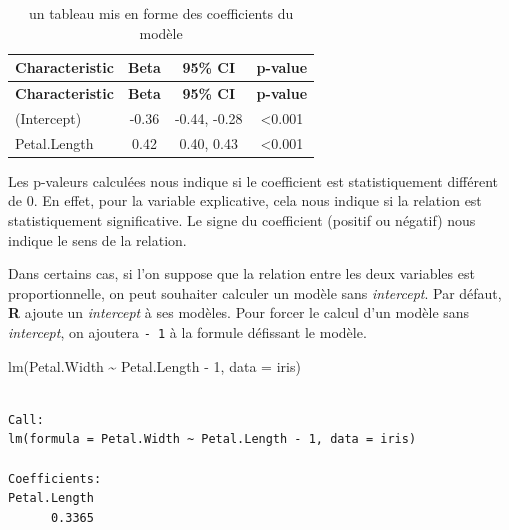\documentclass[
  letterpaper,
  DIV=11,
  numbers=noendperiod,
  oneside]{scrreprt}
\newenvironment{Shaded}{\begin{snugshade}}{\end{snugshade}}
\newcommand{\AttributeTok}[1]{\textcolor[rgb]{0.40,0.45,0.13}{#1}}
\newcommand{\DecValTok}[1]{\textcolor[rgb]{0.68,0.00,0.00}{#1}}
\newcommand{\FunctionTok}[1]{\textcolor[rgb]{0.28,0.35,0.67}{#1}}
\newcommand{\NormalTok}[1]{\textcolor[rgb]{0.00,0.23,0.31}{#1}}
\newcommand{\SpecialCharTok}[1]{\textcolor[rgb]{0.37,0.37,0.37}{#1}}
\begin{document}
\hypertarget{tbl-regression-lm}{}
\begin{longtable}[]{@{}lccc@{}}
\caption{\label{tbl-regression-lm}un tableau mis en forme des
coefficients du modèle}\tabularnewline
\toprule()
\textbf{Characteristic} & \textbf{Beta} & \textbf{95\% CI} &
\textbf{p-value} \\
\midrule()
\endfirsthead
\toprule()
\textbf{Characteristic} & \textbf{Beta} & \textbf{95\% CI} &
\textbf{p-value} \\
\midrule()
\endhead
(Intercept) & -0.36 & -0.44, -0.28 & \textless0.001 \\
Petal.Length & 0.42 & 0.40, 0.43 & \textless0.001 \\
\bottomrule()
\end{longtable}

Les p-valeurs calculées nous indique si le coefficient est
statistiquement différent de 0. En effet, pour la variable explicative,
cela nous indique si la relation est statistiquement significative. Le
signe du coefficient (positif ou négatif) nous indique le sens de la
relation.

\begin{tcolorbox}[enhanced jigsaw, colbacktitle=quarto-callout-tip-color!10!white, opacityback=0, toprule=.15mm, colback=white, coltitle=black, bottomtitle=1mm, toptitle=1mm, titlerule=0mm, rightrule=.15mm, title=\textcolor{quarto-callout-tip-color}{\faLightbulb}\hspace{0.5em}{Astuce}, breakable, bottomrule=.15mm, opacitybacktitle=0.6, arc=.35mm, left=2mm, leftrule=.75mm, colframe=quarto-callout-tip-color-frame]

Dans certains cas, si l'on suppose que la relation entre les deux
variables est proportionnelle, on peut souhaiter calculer un modèle sans
\emph{intercept}. Par défaut, \textbf{R} ajoute un \emph{intercept} à
ses modèles. Pour forcer le calcul d'un modèle sans \emph{intercept}, on
ajoutera \texttt{-\ 1} à la formule défissant le modèle.

\begin{Shaded}
\begin{Highlighting}[]
\FunctionTok{lm}\NormalTok{(Petal.Width }\SpecialCharTok{\textasciitilde{}}\NormalTok{ Petal.Length }\SpecialCharTok{{-}} \DecValTok{1}\NormalTok{, }\AttributeTok{data =}\NormalTok{ iris)}
\end{Highlighting}
\end{Shaded}

\begin{verbatim}

Call:
lm(formula = Petal.Width ~ Petal.Length - 1, data = iris)

Coefficients:
Petal.Length  
      0.3365  
\end{verbatim}

\end{tcolorbox}
\end{document}
